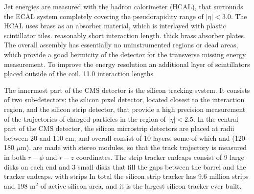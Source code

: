 Jet energies are measured with the hadron calorimeter (HCAL),
that surrounds 
the ECAL system completely covering the pseudorapidity range of $|\eta| < 
3.0$.
The HCAL uses brass as an absorber material, which is interlayed with 
plastic 
scintillator tiles.
%
reasonably short interaction length.
thick brass absorber plates.
The overall assembly has essentially no uninstrumented regions or dead 
areas, which provide 
a good hermicity of the detector for the transverse missing energy 
measurement.
To improve the energy resolution an additional layer of scintillators
placed outside of the coil.
11.0 interaction lengths
 
 The innermost part of the CMS detector is the silicon tracking system. 
 It consists of two sub-detectors: the silicon pixel detector, located 
closest to the interaction 
 region, and the silicon strip detector, that provide a high precision 
measurement of the trajectories
 of charged particles in the region of $|\eta| < 2.5$.
 In the central part of the CMS detector, the silicon microstrip detectors 
are placed 
 at radii between 20 and 110 cm, and overall 
 consist of 10 layers, some of which
and
(120-180 $\mu$m).
are made with stereo modules, 
 so that the track trajectory is measured in 
 both $r-\phi$ and $r-z$ coordinates.
 The strip tracker endcaps consist of 9 large disks on each end
 and 
 3 small disks that fill the gaps between the barrel and the tracker 
endcaps.
with strips 
  In total the silicon strip tracker has 9.6 million strips and 198 m$^2$
of active silicon area, and it is the largest silicon tracker ever built.

